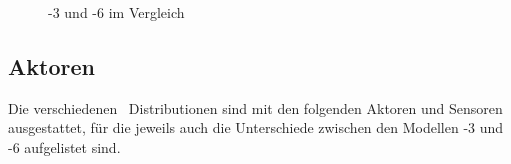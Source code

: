 \begin{figure}[htb]
  \centering
  \hfill
  \caption{-3 und -6 im Vergleich}
  \label{fig:vgl3336}
\end{figure}

\subsection{Aktoren}

Die verschiedenen \cob\ Distributionen sind mit den folgenden Aktoren und Sensoren
ausgestattet, für die jeweils auch die Unterschiede zwischen den Modellen -3 und
-6 aufgelistet sind.

